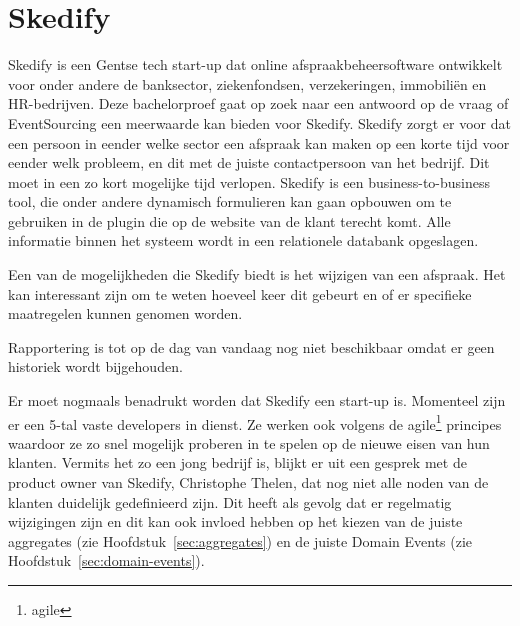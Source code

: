 
\chapter{Skedify}
\label{ch:skedify}

Skedify is een Gentse tech start-up dat online afspraakbeheersoftware ontwikkelt voor onder andere de banksector, ziekenfondsen, verzekeringen, immobiliën en HR-bedrijven. Deze bachelorproef gaat op zoek naar een antwoord op de vraag of EventSourcing een meerwaarde kan bieden voor Skedify. Skedify zorgt er voor dat een persoon in eender welke sector een afspraak kan maken op een korte tijd voor eender welk probleem, en dit met de juiste contactpersoon van het bedrijf. Dit moet in een zo kort mogelijke tijd verlopen. Skedify is een business-to-business tool, die onder andere dynamisch formulieren kan gaan opbouwen om te gebruiken in de plugin die op de website van de klant terecht komt. Alle informatie binnen het systeem wordt in een relationele databank opgeslagen.

Een van de mogelijkheden die Skedify biedt is het wijzigen van een afspraak. Het kan interessant zijn om te weten hoeveel keer dit gebeurt en of er specifieke maatregelen kunnen genomen worden.

Rapportering is tot op de dag van vandaag nog niet beschikbaar omdat er geen historiek wordt bijgehouden.

Er moet nogmaals benadrukt worden dat Skedify een start-up is. Momenteel zijn er een 5-tal vaste developers in dienst. Ze werken ook volgens de \gls{agile}\footnote{\glsdesc{agile}} principes waardoor ze zo snel mogelijk proberen in te spelen op de nieuwe eisen van hun klanten. Vermits het zo een jong bedrijf is, blijkt er uit een gesprek met de product owner van Skedify, Christophe Thelen, dat nog niet alle noden van de klanten duidelijk gedefinieerd zijn. Dit heeft als gevolg dat er regelmatig wijzigingen zijn en dit kan ook invloed hebben op het kiezen van de juiste aggregates (zie Hoofdstuk~\ref{sec:aggregates}) en de juiste Domain Events (zie Hoofdstuk~\ref{sec:domain-events}).